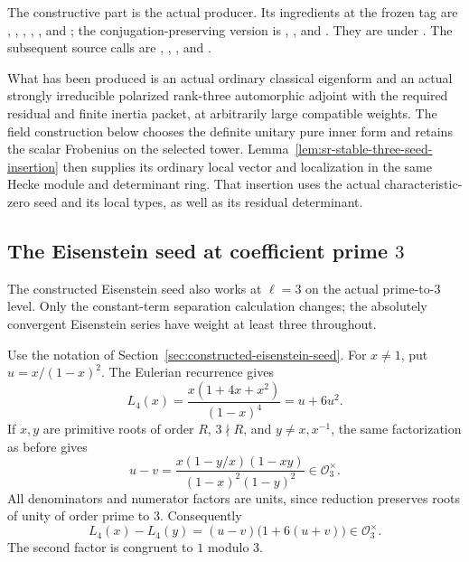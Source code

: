The constructive part is the actual
 producer.
Its ingredients at the frozen tag are
,
, ,
,
, and ;
the conjugation-preserving version is
,
, and .
They are under
.
The subsequent source calls are
,
, , and
.

What has been produced is an actual ordinary classical
eigenform and an actual strongly irreducible polarized
rank-three automorphic adjoint with the required residual
and finite inertia packet, at arbitrarily large compatible
weights.
The field construction below chooses the definite unitary
pure inner form and retains the scalar Frobenius on the
selected tower. Lemma~\ref{lem:sr-stable-three-seed-insertion}
then supplies its ordinary local vector and localization
in the same Hecke module and determinant ring. That
insertion uses the actual characteristic-zero seed and
its local types, as well as its residual determinant.


\subsection{The Eisenstein seed at coefficient prime \(3\)}
\label{subsec:sr-eisenstein-three}
The constructed Eisenstein seed also works at \(\ell=3\)
on the actual prime-to-\(3\) level.
Only the constant-term separation calculation changes;
the absolutely convergent Eisenstein series have weight
at least three throughout.

Use the notation of
Section~\ref{sec:constructed-eisenstein-seed}.
For \(x\ne1\), put \(u=x/(1-x)^2\).
The Eulerian recurrence gives
\[
        L_4(x)=\frac{x(1+4x+x^2)}{(1-x)^4}
                                     =u+6u^2 .
 \tag{E3.1}
\]
If \(x,y\) are primitive roots of order \(R\), \(3\nmid R\),
and \(y\ne x,x^{-1}\), the same factorization as before gives
\[
 u-v=\frac{x(1-y/x)(1-xy)}
                         {(1-x)^2(1-y)^2}
                      \in\mathcal O_3^\times .
\]
All denominators and numerator factors are units, since
reduction preserves roots of unity of order prime to \(3\).
Consequently
\[
          L_4(x)-L_4(y)
               =(u-v)\bigl(1+6(u+v)\bigr)
                          \in\mathcal O_3^\times .
 \tag{E3.2}
\]
The second factor is congruent to \(1\) modulo \(3\).


